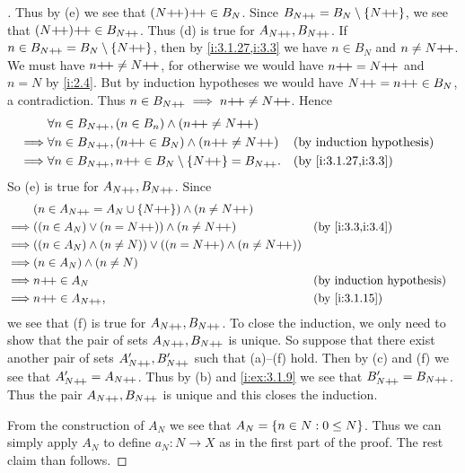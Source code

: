 \begin{proof}[]
  Thus by (e) we see that \((N{+}\!{+}){+}\!{+} \in B_N\).
  Since \(B_{N{+}\!{+}} = B_N \setminus \left\lbrace N{+}\!{+}\right\rbrace\), we see that \((N{+}\!{+}){+}\!{+} \in B_{N{+}\!{+}}\).
  Thus (d) is true for \(A_{N{+}\!{+}}, B_{N{+}\!{+}}\).
  If \(n \in B_{N{+}\!{+}} = B_N \setminus \left\lbrace N{+}\!{+}\right\rbrace\), then by \cref{i:3.1.27,i:3.3} we have \(n \in B_N\) and \(n \neq N{+}\!{+}\).
  We must have \(n{+}\!{+} \neq N{+}\!{+}\), for otherwise we would have \(n{+}\!{+} = N{+}\!{+}\) and \(n = N\) by \cref{i:2.4}.
  But by induction hypotheses we would have \(N{+}\!{+} = n{+}\!{+} \in B_N\), a contradiction.
  Thus \(n \in B_{N{+}\!{+}} \implies n{+}\!{+} \neq N{+}\!{+}\).
  Hence
  \begin{align*}
             & \forall n \in B_{N\pp}, (n \in B_n) \land (n\pp \neq N\pp)                                     \\
    \implies & \forall n \in B_{N\pp}, (n\pp \in B_N) \land (n\pp \neq N\pp)         &  & \byIH               \\
    \implies & \forall n \in B_{N\pp}, n\pp \in B_N \setminus \set{N\pp} = B_{N\pp}. &  & \by{i:3.1.27,i:3.3}
  \end{align*}
  So (e) is true for \(A_{N{+}\!{+}}, B_{N{+}\!{+}}\).
  Since
  \begin{align*}
             & (n \in A_{N\pp} = A_N \cup \set{N\pp}) \land (n \neq N\pp)                                 \\
    \implies & ((n \in A_N) \lor (n = N\pp)) \land (n \neq N\pp)                    &  & \by{i:3.3,i:3.4} \\
    \implies & ((n \in A_N) \land (n \neq N)) \lor ((n = N\pp) \land (n \neq N\pp))                       \\
    \implies & (n \in A_N) \land (n \neq N)                                                               \\
    \implies & n\pp \in A_N                                                         &  & \byIH            \\
    \implies & n\pp \in A_{N\pp},                                                   &  & \by{i:3.1.15}
  \end{align*}
  we see that (f) is true for \(A_{N{+}\!{+}}, B_{N{+}\!{+}}\).
  To close the induction, we only need to show that the pair of sets \(A_{N{+}\!{+}}, B_{N{+}\!{+}}\) is unique.
  So suppose that there exist another pair of sets \(A_{N{+}\!{+}}', B_{N{+}\!{+}}'\) such that (a)--(f) hold.
  Then by (c) and (f) we see that \(A_{N{+}\!{+}}' = A_{N{+}\!{+}}\).
  Thus by (b) and \cref{i:ex:3.1.9} we see that \(B_{N{+}\!{+}}' = B_{N{+}\!{+}}\).
  Thus the pair \(A_{N{+}\!{+}}, B_{N{+}\!{+}}\) is unique and this closes the induction.

  From the construction of \(A_N\) we see that \(A_N = \left\lbrace n \in N : 0 \leq N\right\rbrace\).
  Thus we can simply apply \(A_N\) to define \(a_N : N \to X\) as in the first part of the proof.
  The rest claim than follows.
\end{proof}

